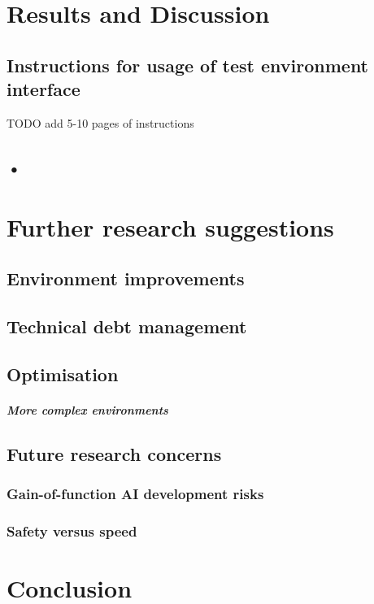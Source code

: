 \documentclass[masterthesis]{fer}
\begin{document}
\chapter{Results and Discussion}
\label{sec:results_and_discussion}
\section{Instructions for usage of test environment interface}
TODO add 5-10 pages of instructions
\section{•}


\chapter{Further research suggestions}

\label{sec:further_research_suggestions}
\section{Environment improvements}
\section{Technical debt management}
\section{Optimisation}
\paragraph{More complex environments}
\section{Future research concerns}
\subsection{Gain-of-function AI development risks}
\subsection{Safety versus speed}

\chapter{Conclusion}
\label{chp:conclusion}
\end{document}
